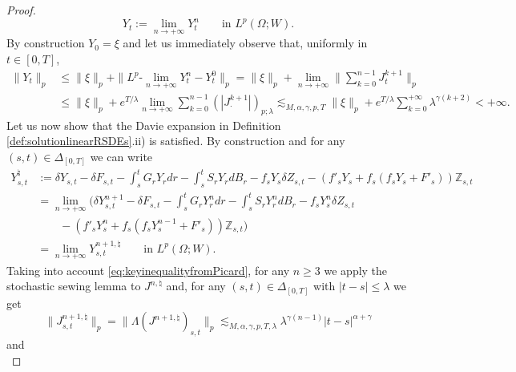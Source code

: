\documentclass[11pt,a4paper]{article}
\theoremstyle{plain}
\begin{document}
\begin{proof}
    \begin{equation*} \label{eq:definitionofthesolutionforPicard}
        Y_t :=  \lim_{n \to +\infty} Y^n_t \qquad \text{in $L^p(\Omega;W)$}. 
    \end{equation*} 
    By construction $Y_0 = \xi$ and let us immediately observe that, uniformly in $t \in [0,T]$,  
    \begin{equation*} \label{eq:boundednessofthesolutionPicard}
        \begin{aligned}
            \|Y_t\|_p  &\le \|\xi\|_p+ \|L^p\text{-}\lim_{n \to +\infty} Y^n_t - Y_t^0\|_p = \|\xi\|_p + \lim_{n \to +\infty} \| \sum_{k=0}^{n-1}J^{k+1}_t\|_p \\
            &\le \|\xi\|_p + e^{T/\lambda} \lim_{n \to +\infty} \sum_{k=0}^{n-1} (|J^{k+1}_\cdot|)_{p;\lambda} \lesssim_{M,\alpha,\gamma,p,T} \|\xi\|_p + e^{T/\lambda}   \sum_{k=0}^{+\infty} \lambda^{\gamma(k+2)} < +\infty. 
        \end{aligned}
    \end{equation*}  
    Let us now show that the Davie expansion in Definition \ref{def:solutionlinearRSDEs}.ii) is satisfied. 
    By construction and for any $(s,t) \in \Delta_{[0,T]}$ we can write 
    \begin{equation*} \begin{aligned}
        Y^{\natural}_{s,t}  
        &:= \delta Y_{s,t} - \delta F_{s,t} -   \int_s^tG_rY_rdr - \int_s^tS_rY_rdB_r - f_sY_s\delta Z_{s,t}  - (f'_sY_s+ f_s(f_s Y_s+F'_s))\mathbb{Z}_{s,t} \\ 
        &= \lim_{n \to +\infty} \Big(\delta Y^{n+1}_{s,t} -   \delta F_{s,t} - \int_s^tG_rY_r^ndr - \int_s^tS_rY_r^ndB_r   - f_sY_s^n\delta Z_{s,t} \\ & \qquad  - (f'_sY^n_s+ f_s(f_sY^{n-1}_s+F'_s))\mathbb{Z}_{s,t} \Big) \\
        &= \lim_{n \to +\infty} Y^{n+1,\natural}_{s,t} \qquad \text{in $L^p(\Omega;W)$}. 
        \end{aligned}
    \end{equation*}
    Taking into account \eqref{eq:keyinequalityfromPicard}, for any $n \ge 3$ we apply the stochastic sewing lemma \cite[Theorem 2.9]{FHL21} to $J^{n,\natural}$ and, for any $(s,t) \in \Delta_{[0,T]}$ with $|t-s|\le \lambda$ we get \begin{equation*}
        \|J^{n+1,\natural}_{s,t}\|_p = \|\Lambda(J^{n+1,\natural})_{s,t}\|_p \lesssim_{M,\alpha,\gamma,p,T,\lambda} \lambda^{\gamma(n-1)} |t-s|^{\alpha+\gamma}
    \end{equation*} and \begin{equation*}

\end{equation*}
\end{proof}
\end{document}
